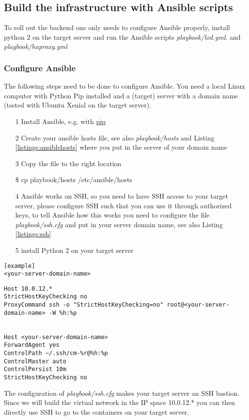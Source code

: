 \subsection{Build the infrastructure with Ansible scripts}
To roll out the backend one only needs to configure Ansible properly, install python 2 on the target server and run the Ansible scripts \textit{playbook/lxd.yml}. and \textit{playbook/haproxy.yml}

\subsubsection{Configure Ansible}
The following steps need to be done to configure Ansible. You need a local Linux computer with Python Pip installed and a (target) server with a domain name (tested with Ubuntu Xenial on the target server). 
\begin{itemize}
	\item[1] Install Ansible, e.g. with \href{http://docs.ansible.com/ansible/intro_installation.html#latest-releases-via-pip}{pip}
	\item[2] Create your ansible hosts file, see also \textit{playbook/hosts} and Listing \ref{listings:ansiblehosts} where you put in the server of your domain name
	\item[3] Copy the file to the right location
	\begin{tcolorbox}
		\$	cp playbook/hosts /etc/ansible/hosts
	\end{tcolorbox}
	\item[4] Ansible works on SSH, so you need to have SSH access to your target server, please configure SSH such that you can use it through authorized keys, to tell Ansible how this works you need to configure the file \textit{playbook/ssh.cfg} and put in your server domain name, see also Listing \ref{listings:ssh}
	\item[5] install Python 2 on your target server
\end{itemize}
\begin{lstlisting}[caption={Example of Ansible hosts file},label={listings:ansiblehosts}]
[example]
<your-server-domain-name>
\end{lstlisting}
\begin{lstlisting}[caption={Example of Ansible ssh.cfg file},label={listings:ssh}]
Host 10.0.12.*
StrictHostKeyChecking no
ProxyCommand ssh -o "StrictHostKeyChecking=no" root@<your-server-domain-name> -W %h:%p


Host <your-server-domain-name>
ForwardAgent yes
ControlPath ~/.ssh/cm-%r@%h:%p
ControlMaster auto
ControlPersist 10m
StrictHostKeyChecking no

\end{lstlisting}
The configuration of \textit{playbook/ssh.cfg} makes your target server an SSH bastion. Since we will build the virtual network in the IP space 10.0.12.* you can then directly use SSH to go to the containers on your target server. 


